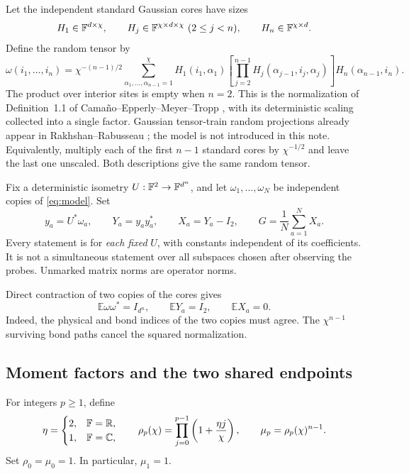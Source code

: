 \documentclass[11pt]{article}
\numberwithin{equation}{section}
\theoremstyle{definition}\newtheorem{definition}[theorem]{Definition}
\theoremstyle{remark}\newtheorem{remark}[theorem]{Remark}
\newcommand{\R}{\mathbb R}\newcommand{\E}{\mathbb E}\newcommand{\Prob}{\mathbb P}
\newcommand{\C}{\mathbb C}
\begin{document}
Let the independent standard Gaussian cores have sizes
\[
 H_1\in\mathbb F^{d\times\chi},\qquad
 H_j\in\mathbb F^{\chi\times d\times\chi}\ (2\le j<n),\qquad
 H_n\in\mathbb F^{\chi\times d}.
\]
Define the random tensor by
\begin{equation}\label{eq:model}
 \omega(i_1,\ldots,i_n)=\chi^{-(n-1)/2}
 \sum_{\alpha_1,\ldots,\alpha_{n-1}=1}^{\chi}
 H_1(i_1,\alpha_1)
 \left[\prod_{j=2}^{n-1}H_j(\alpha_{j-1},i_j,\alpha_j)\right]
 H_n(\alpha_{n-1},i_n).
\end{equation}
The product over interior sites is empty when $n=2$.
This is the normalization of Definition~1.1 of Cama\~no--Epperly--Meyer--Tropp
\cite{CEMT}, with its deterministic scaling collected into a single factor.
Gaussian tensor-train random projections already appear in Rakhshan--Rabusseau
\cite{RR2020}; the model is not introduced in this note.
Equivalently, multiply each of the first $n-1$ standard cores by $\chi^{-1/2}$
and leave the last one unscaled. Both descriptions give the same random tensor.

Fix a deterministic isometry $U:\mathbb F^2\to\mathbb F^{d^n}$, and let $\omega_1,\ldots,\omega_N$
be independent copies of \eqref{eq:model}. Set
\begin{equation}\label{eq:G}
 y_a=U^*\omega_a,\qquad Y_a=y_ay_a^*,\qquad X_a=Y_a-I_2,
 \qquad G=\frac1N\sum_{a=1}^N X_a.
\end{equation}
Every statement is for \emph{each fixed} $U$, with constants independent of its
coefficients. It is not a simultaneous statement over all subspaces chosen after
observing the probes. Unmarked matrix norms are operator norms.

Direct contraction of two copies of the cores gives
\begin{equation}\label{eq:isotropy}
 \E\omega\omega^*=I_{d^n},\qquad \E Y_a=I_2,\qquad \E X_a=0.
\end{equation}
Indeed, the physical and bond indices of the two copies must agree. The
$\chi^{n-1}$ surviving bond paths cancel the squared normalization.

\subsection{Moment factors and the two shared endpoints}
For integers $p\ge1$, define
\begin{equation}\label{eq:rho}
 \eta=\begin{cases}2,&\F=\R,\\1,&\F=\C,\end{cases}\qquad
 \rho_p(\chi)=\prod_{j=0}^{p-1}\left(1+\frac{\eta j}{\chi}\right),\qquad
 \mu_p=\rho_p(\chi)^{n-1}.
\end{equation}
Set $\rho_0=\mu_0=1$. In particular, $\mu_1=1$.
\end{document}
